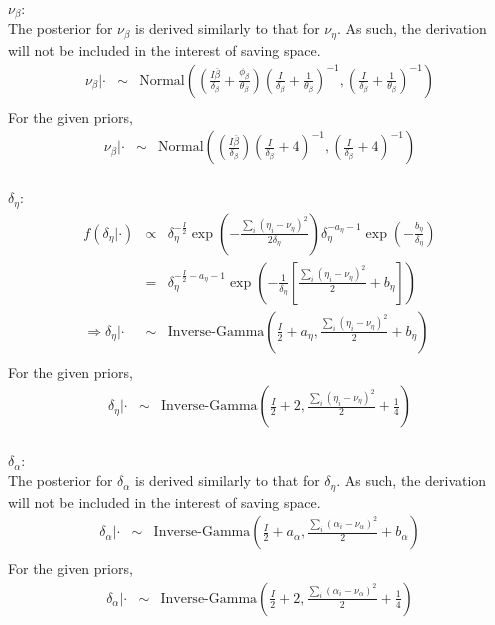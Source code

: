 $\nu_{\beta}$:\\
The posterior for $\nu_{\beta}$ is derived similarly to that for
$\nu_{\eta}$.  As such, the derivation will not be included in the
interest of saving space.
\begin{eqnarray*}
\nu_{\beta}|\cdot&\sim&\mbox{Normal}\left(\left(\frac{I\bar{\beta}}{\delta_{\beta}}+\frac{\phi_{\beta}}{\theta_{\beta}}\right)\left(\frac{I}{\delta_{\beta}}+\frac{1}{\theta_{\beta}}\right)^{-1},\left(\frac{I}{\delta_{\beta}}+\frac{1}{\theta_{\beta}}\right)^{-1}\right)\\
\end{eqnarray*}
For the given priors,
\begin{eqnarray*}
\nu_{\beta}|\cdot&\sim&\mbox{Normal}\left(\left(\frac{I\bar{\beta}}{\delta_{\beta}}\right)\left(\frac{I}{\delta_{\beta}}+4\right)^{-1},\left(\frac{I}{\delta_{\beta}}+4\right)^{-1}\right)\\
\end{eqnarray*}

$\delta_{\eta}$:\\
\begin{eqnarray*}
f(\delta_{\eta}|\cdot)&\propto&\delta_{\eta}^{-\frac{I}{2}}\exp\left(-\frac{\sum_i(\eta_i-\nu_{\eta})^2}{2\delta_{\eta}}\right)\delta_{\eta}^{-a_{\eta}-1}\exp\left(-\frac{b_{\eta}}{\delta_{\eta}}\right)\\
&=&\delta_{\eta}^{-\frac{I}{2}-a_{\eta}-1}\exp\left(-\frac{1}{\delta_{\eta}}\left[\frac{\sum_i(\eta_i-\nu_{\eta})^2}{2}+b_{\eta}\right]\right)\\
\Rightarrow \delta_{\eta}|\cdot&\sim&\mbox{Inverse-Gamma}\left(\frac{I}{2}+a_{\eta},\frac{\sum_i(\eta_i-\nu_{\eta})^2}{2}+b_{\eta}\right)\\
\end{eqnarray*}
For the given priors,
\begin{eqnarray*}
\delta_{\eta}|\cdot&\sim&\mbox{Inverse-Gamma}\left(\frac{I}{2}+2,\frac{\sum_i(\eta_i-\nu_{\eta})^2}{2}+\frac{1}{4}\right)\\
\end{eqnarray*}

$\delta_{\alpha}$:\\
The posterior for $\delta_{\alpha}$ is derived similarly to that for
$\delta_{\eta}$.  As such, the derivation will not be included in the
interest of saving space.
\begin{eqnarray*}
\delta_{\alpha}|\cdot&\sim&\mbox{Inverse-Gamma}\left(\frac{I}{2}+a_{\alpha},\frac{\sum_i(\alpha_i-\nu_{\alpha})^2}{2}+b_{\alpha}\right)\\
\end{eqnarray*}
For the given priors,
\begin{eqnarray*}
\delta_{\alpha}|\cdot&\sim&\mbox{Inverse-Gamma}\left(\frac{I}{2}+2,\frac{\sum_i(\alpha_i-\nu_{\alpha})^2}{2}+\frac{1}{4}\right)\\
\end{eqnarray*}

